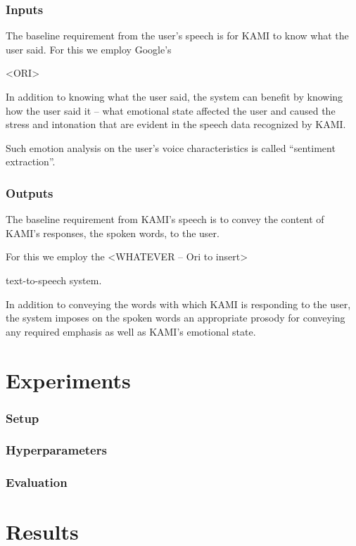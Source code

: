 \documentclass[11pt,a4paper]{article}
\begin{document}
\subsubsection{Inputs}
The baseline requirement from the user’s speech is for KAMI to know what the user
said. For this we employ Google’s 

<ORI> 

In addition to knowing what the user said, the system can benefit by knowing how the
user said it – what emotional state affected the user and caused the stress and intonation
that are evident in the speech data recognized by KAMI. 

Such emotion analysis on the
user’s voice characteristics is called “sentiment extraction”.


\subsubsection{Outputs}
The baseline requirement from KAMI’s speech is to convey the content of KAMI’s
responses, the spoken words, to the user. 

For this we employ the 
<WHATEVER – Ori to insert> 

text-to-speech system. 

In addition to conveying the words with which KAMI
is responding to the user, the system imposes on the spoken words an appropriate
prosody for conveying any required emphasis as well as KAMI’s emotional state.

\section{Experiments}
\subsubsection{Setup}

\subsubsection{Hyperparameters}

\subsubsection{Evaluation} %

\section{Results}
\end{document}
